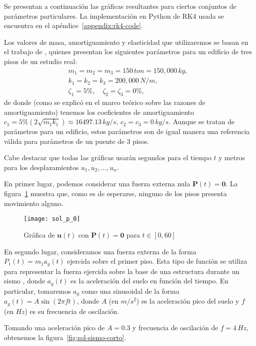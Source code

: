 Se presentan a continuación las gráficas resultantes para ciertos conjuntos de parámetros particulares. La implementación en Python de RK4 usada se encuentra en el apéndice~\ref{appendix:rk4-code}.

Los valores de masa, amortiguamiento y elasticidad que utilizaremos se basan en el trabajo de \citet{tarque}, quienes presentan los siguientes parámetros para un edificio de tres pisos de un estudio real:
\begin{gather}
    m_1 = m_2 = m_3 = 150 \, \si{ton} = 150,000 \, \si{kg}, \\
    k_1 = k_2 = k_3 = 200,000 \, \si{N/m}, \\
    \zeta_1 = 5\%, \quad \zeta_2 = \zeta_3 = 0\%
,\end{gather}
de donde (como se explicó en el marco teórico sobre las razones de amortiguamiento) tenemos los coeficientes de amortiguamiento \(c_1 = 5\%(2\sqrt{m_1 k_1}) \approx 16497.13 \, \si{kg/s}, \,
c_2 = c_3 = 0 \, \si{kg/s}\). Aunque se tratan de parámetros para un edificio, estos parámetros son de igual manera una referencia válida para parámetros de un puente de 3 pisos.

Cabe destacar que todas las gráficas usarán segundos para el tiempo \(t\) y metros para los desplazamientos \(u_1, u_2, \ldots, u_n\).

En primer lugar, podemos considerar una fuerza externa nula \(\mathbf{P}(t) = \mathbf{0}\). La figura~\ref{fig:sol-p-0} muestra que, como es de esperarse, ninguno de los pisos presenta movimiento alguno.

\begin{figure}[ht!]
    \centering
    \texttt{[image: sol\_p\_0]}
    \caption{Gráfica de \(\mathbf{u}(t)\) con \(\mathbf{P}(t) = \mathbf{0}\) para \(t \in [0, 60]\)}
    \label{fig:sol-p-0}
\end{figure}

En segundo lugar, consideramos una fuerza externa de la forma \(P_1(t) = m_1 a_g(t)\) ejercida sobre el primer piso. Esta tipo de función se utiliza para representar la fuerza ejercida sobre la base de una estructura durante un sismo \citep{kramer}, donde \(a_g(t)\) es la aceleración del suelo en función del tiempo. En particular, tomaremos \(a_g\) como una sinusoidal de la forma \(a_g(t) = A\sin(2\pi f t)\), donde \(A\) (en \(\si{m/s^2}\)) es la aceleración pico del suelo y \(f\) (en \(\si{Hz}\)) es su frecuencia de oscilación.

Tomando una aceleración pico de \(A = 0.3\) y frecuencia de oscilación de \(f = 4 \, \si{Hz}\), obtenemos la figura~\ref{fig:sol-sismo-corto}.

